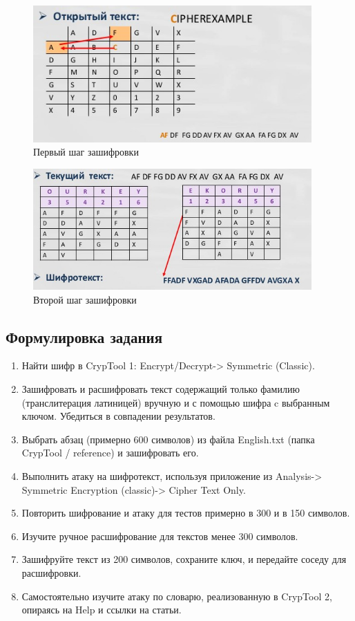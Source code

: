 \documentclass[a4paper, 14pt]{extarticle}
\begin{document}
\begin{figure}[h]
    \centering
    \includegraphics[width=0.95\textwidth]{./img/S001.jpg}
    \caption{Первый шаг зашифровки}%
    \label{img:2:1}
\end{figure}

\begin{figure}[h]
    \centering
    \includegraphics[width=0.95\textwidth]{./img/S002.jpg}
    \caption{Второй шаг зашифровки}%
    \label{img:2:2}
\end{figure}

\subsection{Формулировка задания}
\begin{enumerate}
    \item Найти шифр в CrypTool 1: Encrypt/Decrypt-> Symmetric (Classic).
    \item Зашифровать и расшифровать текст содержащий только фамилию (транслитерация латиницей) вручную и с помощью шифра c выбранным ключом. Убедиться в совпадении результатов.
    \item Выбрать абзац (примерно 600 символов) из файла English.txt (папка CrypTool / reference) и зашифровать его.
    \item Выполнить атаку на шифротекст, используя приложение из Analysis-> Symmetric Encryption (classic)-> Cipher Text Only.
    \item Повторить шифрование и атаку для тестов примерно в 300 и в 150 символов.
    \item Изучите ручное расшифрование для текстов менее 300 символов.
    \item Зашифруйте текст из 200 символов, сохраните ключ, и передайте соседу для расшифровки.
    \item Самостоятельно изучите атаку по словарю, реализованную в CrypTool 2, опираясь на Help и ссылки на статьи.
\end{enumerate}
\end{document}
